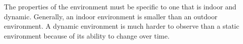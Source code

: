 The properties of the environment must be specific to one that is indoor and dynamic. Generally, an indoor environment is smaller than an outdoor environment. A dynamic environment is much harder to observe than a static environment because of its ability to change over time.
